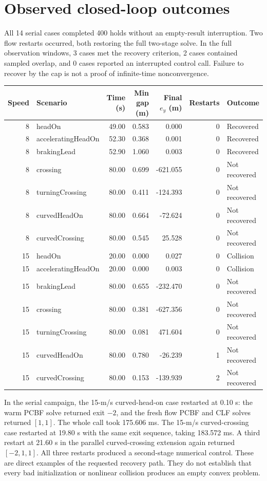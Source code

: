 \documentclass[10pt]{article}
\begin{document}
\section{Observed closed-loop outcomes}
All 14 serial cases completed 400 holds without an empty-result interruption. Two flow restarts occurred, both restoring the full two-stage solve. In the full observation windows, 3 cases met the recovery criterion, 2 cases contained sampled overlap, and 0 cases reported an interrupted control call. Failure to recover by the cap is not a proof of infinite-time nonconvergence.
\begin{longtable}{rlrrrrl}
\toprule Speed & Scenario & Time (s) & Min gap (m) & Final $e_y$ (m) & Restarts & Outcome \\
\midrule\endhead
8 & headOn & 49.00 & 0.583 & 0.000 & 0 & Recovered \\
8 & acceleratingHeadOn & 52.30 & 0.368 & 0.001 & 0 & Recovered \\
8 & brakingLead & 52.90 & 1.060 & 0.003 & 0 & Recovered \\
8 & crossing & 80.00 & 0.699 & -621.055 & 0 & Not recovered \\
8 & turningCrossing & 80.00 & 0.411 & -124.393 & 0 & Not recovered \\
8 & curvedHeadOn & 80.00 & 0.664 & -72.624 & 0 & Not recovered \\
8 & curvedCrossing & 80.00 & 0.545 & 25.528 & 0 & Not recovered \\
15 & headOn & 20.00 & 0.000 & 0.027 & 0 & Collision \\
15 & acceleratingHeadOn & 20.00 & 0.000 & 0.003 & 0 & Collision \\
15 & brakingLead & 80.00 & 0.655 & -232.470 & 0 & Not recovered \\
15 & crossing & 80.00 & 0.381 & -627.356 & 0 & Not recovered \\
15 & turningCrossing & 80.00 & 0.081 & 471.604 & 0 & Not recovered \\
15 & curvedHeadOn & 80.00 & 0.780 & -26.239 & 1 & Not recovered \\
15 & curvedCrossing & 80.00 & 0.153 & -139.939 & 2 & Not recovered \\
\bottomrule\end{longtable}
In the serial campaign, the 15-m/s curved-head-on case restarted at 0.10 s: the warm PCBF solve returned exit $-2$, and the fresh flow PCBF and CLF solves returned $[1,1]$. The whole call took 175.606 ms. The 15-m/s curved-crossing case restarted at 19.80 s with the same exit sequence, taking 183.572 ms. A third restart at 21.60 s in the parallel curved-crossing extension again returned $[-2,1,1]$. All three restarts produced a second-stage numerical control. These are direct examples of the requested recovery path. They do not establish that every bad initialization or nonlinear collision produces an empty convex problem.
\end{document}
